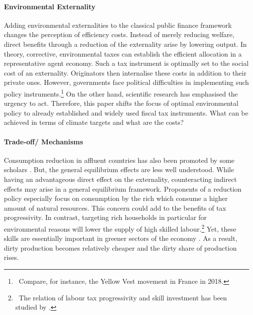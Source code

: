\paragraph{Environmental Externality}
Adding environmental externalities to the classical public finance framework changes the perception of efficiency costs. Instead of merely reducing welfare, direct benefits through a reduction of the externality arise by lowering output. 
In theory, corrective, environmental taxes can establish the efficient allocation in a representative agent economy. Such a tax instrument is optimally set to the social cost of an externality. Originators then internalise these costs in addition to their private ones. However, governments face political difficulties in implementing such policy instruments.\footnote{\ Compare, for instance, the Yellow Vest movement in France in 2018.} On the other hand, scientific research has emphasised the urgency to act. Therefore, this paper shifts the focus of optimal environmental policy to already established and widely used fiscal tax instruments. What can be achieved in terms of climate targets and what are the costs?

\paragraph{Trade-off/ Mechanisms}
 Consumption reduction in affluent countries has also been promoted by some  scholars \citep{Schor2005SustainableReduction, Pullinger2014WorkingDesign, Arrow2004AreMuch}. But, the general equilibrium effects are less well understood.
While having an advantageous direct effect on the externality, counteracting indirect effects may arise in a general equilibrium framework. Proponents of a reduction policy especially focus on consumption by the rich which consume a higher amount of natural resources. %
This concern could add to the benefits of tax progressivity.
In contrast, targeting rich households in particular for environmental reasons will lower the supply of high skilled labour.\footnote{\ The relation of labour tax progressivity and skill investment has been studied by \cite{Heathcote2017OptimalFramework}.} Yet, these skills are essentially important in greener sectors of the economy \citep{Consoli2016DoCapital}. As a result, dirty production becomes relatively cheaper and the dirty share of production rises. 

